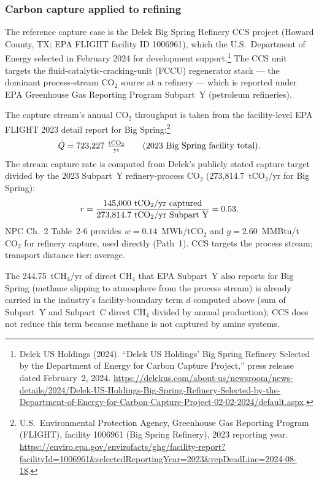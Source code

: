 \documentclass[11pt]{article}
\newcommand{\cotwo}{\ensuremath{\mathrm{CO_2}}}
\newcommand{\chfour}{\ensuremath{\mathrm{CH_4}}}
\begin{document}
\subsubsection{Carbon capture applied to refining}

The reference capture case is the Delek Big Spring Refinery CCS project (Howard County, TX; EPA FLIGHT facility ID 1006961), which the U.S.\ Department of Energy selected in February 2024 for development support.\footnote{Delek US Holdings (2024). ``Delek US Holdings' Big Spring Refinery Selected by the Department of Energy for Carbon Capture Project,'' press release dated February~2, 2024. \url{https://delekus.com/about-us/newsroom/news-details/2024/Delek-US-Holdings-Big-Spring-Refinery-Selected-by-the-Department-of-Energy-for-Carbon-Capture-Project-02-02-2024/default.aspx}.} The CCS unit targets the fluid-catalytic-cracking-unit (FCCU) regenerator stack --- the dominant process-stream \cotwo{} source at a refinery --- which is reported under EPA Greenhouse Gas Reporting Program Subpart~Y (petroleum refineries).

The capture stream's annual \cotwo{} throughput is taken from the facility-level EPA FLIGHT 2023 detail report for Big Spring:\footnote{U.S.\ Environmental Protection Agency, Greenhouse Gas Reporting Program (FLIGHT), facility 1006961 (Big Spring Refinery), 2023 reporting year. \url{https://enviro.epa.gov/envirofacts/ghg/facility-report?facilityId=1006961&selectedReportingYear=2023&repDeadLine=2024-08-18}.}
%
\[
  \dot{Q} = 723{,}227~\tfrac{\text{t\cotwo{}}}{\text{yr}} \qquad \text{(2023 Big Spring facility total)}.
\]
%
The stream capture rate is computed from Delek's publicly stated capture target divided by the 2023 Subpart~Y refinery-process \cotwo{} (273{,}814.7~t\cotwo{}/yr for Big Spring):
%
\[
  r = \frac{145{,}000~\text{t\cotwo{}/yr captured}}{273{,}814.7~\text{t\cotwo{}/yr Subpart Y}} = 0.53.
\]
%
NPC Ch.~2 Table~2-6 provides $w = 0.14$~MWh/t\cotwo{} and $g = 2.60$~MMBtu/t\cotwo{} for refinery capture, used directly (Path~1). CCS targets the process stream; transport distance tier: average.

The 244.75~t\chfour{}/yr of direct \chfour{} that EPA Subpart~Y also reports for Big Spring (methane slipping to atmosphere from the process stream) is already carried in the industry's facility-boundary term $d$ computed above (sum of Subpart~Y and Subpart~C direct \chfour{} divided by annual production); CCS does not reduce this term because methane is not captured by amine systems.
\end{document}
